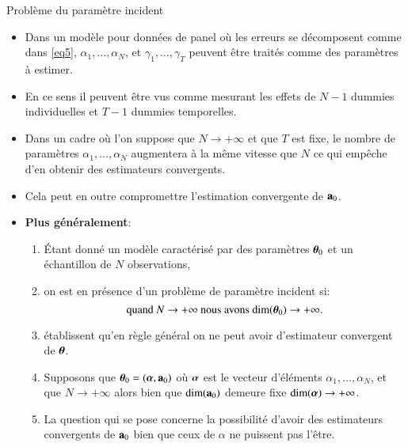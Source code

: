 \begin{frame}[allowframebreaks]{Problème du paramètre incident}
\begin{itemize}
    \item Dans un modèle pour données de panel où les erreurs se décomposent comme dans \eqref{eq5}, 
    $\alpha_1, \ldots, \alpha_N$, et $\gamma_1, \ldots, \gamma_T$ peuvent être traités comme des 
    paramètres à estimer. 
    \item En ce sens il peuvent être vus comme mesurant les effets de $N-1$ 
    dummies individuelles et $T-1$ dummies temporelles. 
    \item Dans un cadre où l'on suppose que $N\rightarrow +\infty$ et que $T$ est fixe, 
    le nombre de paramètres $\alpha_1, \ldots, \alpha_N$ augmentera à la même 
    vitesse que $N$ ce qui empêche d'en obtenir des estimateurs convergents.
    \item Cela peut en outre compromettre l'estimation convergente de ${\mathbf a}_0$.
    
    \framebreak

    \item \textbf{Plus généralement}:
    \begin{enumerate}[$\star$]
    \item Étant donné un modèle caractérisé par des paramètres 
    ${\boldsymbol \theta}_0$ et un échantillon de $N$ observations, 
    \item on est en présence d'un problème de paramètre incident si:
    \[
        \text{quand} \ N \rightarrow +\infty \ \text{nous avons} \ \mathrm{dim}({\boldsymbol \theta}_0) \rightarrow +\infty.
    \]
    \item \cite{NeymanScott1948} établissent qu'en règle général on ne peut avoir d'estimateur convergent 
    de ${\boldsymbol \theta}$.
    \item Supposons que ${\boldsymbol \theta}_0  = ({\boldsymbol \alpha}, {\mathbf a}_0)$ où 
    ${\boldsymbol \alpha}$ est le vecteur d'éléments $\alpha_1, \ldots, \alpha_N$, 
    et que $N\rightarrow+\infty$ alors bien que $\mathrm{dim}({\mathbf a}_0)$ demeure fixe 
    $\mathrm{dim}({\boldsymbol \alpha})\rightarrow+\infty$.
    \item La question qui se pose concerne la possibilité d'avoir des estimateurs convergents de 
    ${\mathbf a}_0$ bien que ceux de $\alpha$ ne puissent pas l'être.
    \end{enumerate}
\end{itemize}
\end{frame}
